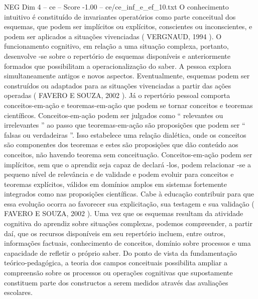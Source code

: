 \begin{textsample}{NEG Dim 4 – ce – Score -1.00 – ce/ce\_inf\_e\_ef\_10.txt}
O conhecimento intuitivo é constituído de invariantes operatórios como parte conceitual dos esquemas, que podem ser implícitos ou explícitos, conscientes ou inconscientes, e podem ser aplicados a situações vivenciadas ( VERGNAUD, 1994 ).
O funcionamento cognitivo, em relação a uma situação complexa, portanto, desenvolve -se sobre o repertório de esquemas disponíveis e anteriormente formados que possibilitam a operacionalização do saber.
A pessoa explora simultaneamente antigos e novos aspectos.
Eventualmente, esquemas podem ser construídos ou adaptados para as situações vivenciadas a partir das ações operadas ( FAVERO E SOUZA, 2002 ).
Já o repertório pessoal comporta conceitos-em-ação e teoremas-em-ação que podem se tornar conceitos e teoremas científicos.
Conceitos-em-ação podem ser julgados como “ relevantes ou irrelevantes ” ao passo que teoremas-em-ação são proposições que podem ser “ falsas ou verdadeiras ”.
Isso estabelece uma relação dialética, onde os conceitos são componentes dos teoremas e estes são proposições que dão conteúdo aos conceitos, não havendo teorema sem conceituação.
Conceitos-em-ação podem ser implícitos, sem que o aprendiz seja capaz de declará -los, podem relacionar -se a pequeno nível de relevância e de validade e podem evoluir para conceitos e teoremas explícitos, válidos em domínios amplos em sistemas fortemente integrados como nas proposições científicas.
Cabe à educação contribuir para que essa evolução ocorra ao favorecer sua explicitação, sua testagem e sua validação ( FAVERO E SOUZA, 2002 ).
Uma vez que os esquemas resultam da atividade cognitiva do aprendiz sobre situações complexas, podemos compreender, a partir daí, que os recursos disponíveis em seu repertório incluem, entre outros, informações factuais, conhecimento de conceitos, domínio sobre processos e uma capacidade de refletir o próprio saber.
Do ponto de vista da fundamentação teórico-pedagógica, a teoria dos campos conceituais possibilita ampliar a compreensão sobre os processos ou operações cognitivas que supostamente constituem parte dos constructos a serem medidos através das avaliações escolares.

\end{textsample}
